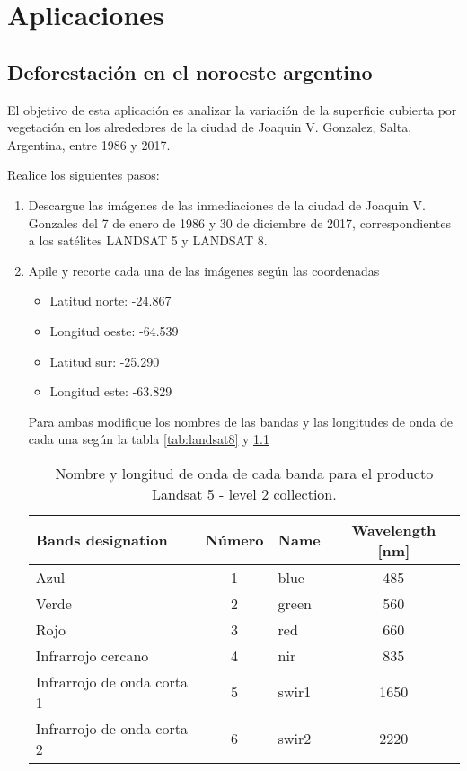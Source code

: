 \chapter{Aplicaciones}

\section{Deforestación en el noroeste argentino}

El objetivo de esta aplicación es analizar la variación de la superficie cubierta por vegetación en los alrededores de la ciudad de Joaquin V. Gonzalez, Salta, Argentina, entre 1986 y 2017.

Realice los siguientes pasos:

\begin{enumerate}
\item Descargue las imágenes de las inmediaciones de la ciudad de Joaquin V. Gonzales del 7 de enero de 1986 y 30 de diciembre de 2017, correspondientes a los satélites LANDSAT 5 y LANDSAT 8.

\item Apile y recorte cada una de las imágenes según las coordenadas

\begin{itemize}
    \item Latitud norte: -24.867
    \item Longitud oeste: -64.539
    \item Latitud sur: -25.290
    \item Longitud este: -63.829
\end{itemize}

Para ambas modifique los nombres de las bandas y las longitudes de onda de cada una según la tabla \ref{tab:landsat8} y \ref{tab:landsat5}

\begin{table}[h!]
  \centering
  \begin{tabular}{@{}lclc@{}}
  \toprule
  Bands designation          & Número & Name  & Wavelength {[}nm{]} \\ \midrule
  Azul                       & 1      & blue  & 485                 \\
  Verde                      & 2      & green & 560                 \\
  Rojo                       & 3      & red   & 660                 \\
  Infrarrojo cercano         & 4      & nir   & 835                 \\
  Infrarrojo de onda corta 1 & 5      & swir1 & 1650                \\
  Infrarrojo de onda corta 2 & 6      & swir2 & 2220                \\ \bottomrule
  \end{tabular}
\caption{Nombre y longitud de onda de cada banda para el producto Landsat 5 - level 2 collection.}
\label{tab:landsat5}
\end{table}


\end{enumerate}

